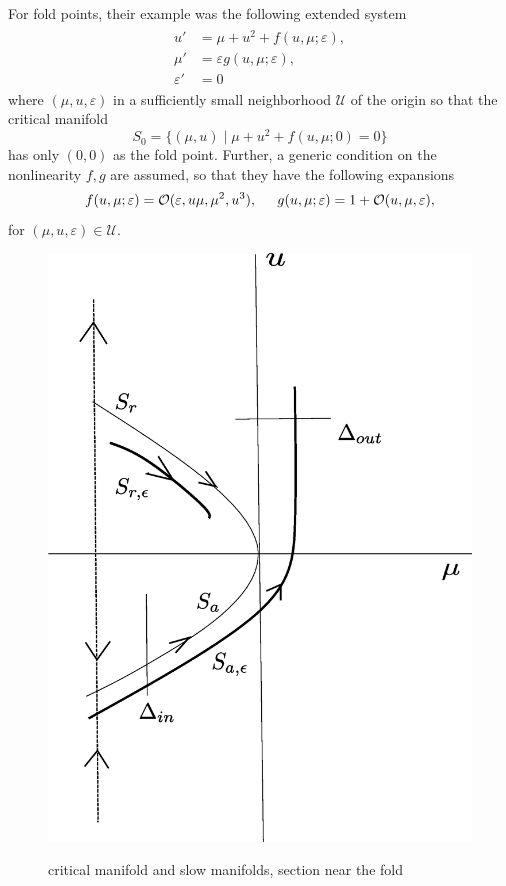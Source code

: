 \documentclass[letterpaper,11pt]{article}
\newcommand{\rmO}{\mathcal{O}}
\newcommand{\eps}{\varepsilon}
\numberwithin{equation}{section}
\theoremstyle{plain}
\begin{document}
For fold points, their example was the following extended system 
\begin{align}\label{ori_eqn}
\begin{split}
u' &= \mu+u^2+ f(u,\mu; \eps),\\
\mu' &=  \eps g(u,\mu; \eps), \\
\eps' &= 0
\end{split}
\end{align}
where $(\mu, u, \eps)$ in a sufficiently small neighborhood $\mathcal{U}$ of the origin so that the critical manifold 
\[
S_0 = \{ (\mu, u) \mid \mu + u^2 +f (u,\mu ;0) = 0\}
\]
 has only $(0,0)$ as the fold point.
 Further, a generic condition on the nonlinearity $f, g$ are assumed, so that they have the following expansions
\begin{equation} \label{fold_nonlinearity}
f(u,\mu;\eps) = \rmO(\eps, u\mu,\mu^2,u^3),\hspace{0.2in}
g(u,\mu;\eps) = 1+\rmO(u,\mu,\eps),
\end{equation} 
for $(\mu, u,\eps) \in \mathcal{U}$.

\begin{figure}[ht]
 \centering %
 \scalebox{0.3} %
 {\includegraphics{figures/passage_fold.eps}} %
 \caption{critical manifold and slow manifolds, section near the fold}\label{fig:passage}
\end{figure}
\end{document}
